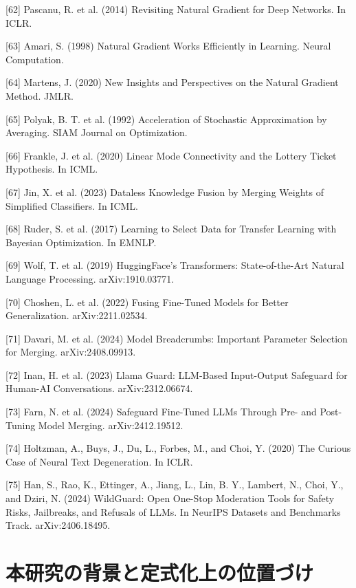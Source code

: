 \documentclass{article}
\begin{document}
{[62] Pascanu, R. et al. (2014) Revisiting Natural Gradient for Deep Networks. In ICLR.

[63] Amari, S. (1998) Natural Gradient Works Efficiently in Learning. Neural Computation.

[64] Martens, J. (2020) New Insights and Perspectives on the Natural Gradient Method. JMLR.

[65] Polyak, B. T. et al. (1992) Acceleration of Stochastic Approximation by Averaging. SIAM Journal on Optimization.

[66] Frankle, J. et al. (2020) Linear Mode Connectivity and the Lottery Ticket Hypothesis. In ICML.

[67] Jin, X. et al. (2023) Dataless Knowledge Fusion by Merging Weights of Simplified Classifiers. In ICML.

[68] Ruder, S. et al. (2017) Learning to Select Data for Transfer Learning with Bayesian Optimization. In EMNLP.

[69] Wolf, T. et al. (2019) HuggingFace's Transformers: State-of-the-Art Natural Language Processing. arXiv:1910.03771.

[70] Choshen, L. et al. (2022) Fusing Fine-Tuned Models for Better Generalization. arXiv:2211.02534.

[71] Davari, M. et al. (2024) Model Breadcrumbs: Important Parameter Selection for Merging. arXiv:2408.09913.

[72] Inan, H. et al. (2023) Llama Guard: LLM-Based Input-Output Safeguard for Human-AI Conversations. arXiv:2312.06674.

[73] Farn, N. et al. (2024) Safeguard Fine-Tuned LLMs Through Pre- and Post-Tuning Model Merging. arXiv:2412.19512.

[74] Holtzman, A., Buys, J., Du, L., Forbes, M., and Choi, Y. (2020) The Curious Case of Neural Text Degeneration. In ICLR.

[75] Han, S., Rao, K., Ettinger, A., Jiang, L., Lin, B. Y., Lambert, N., Choi, Y., and Dziri, N. (2024) WildGuard: Open One-Stop Moderation Tools for Safety Risks, Jailbreaks, and Refusals of LLMs. In NeurIPS Datasets and Benchmarks Track. arXiv:2406.18495.
}


\newpage
\appendix

\section{本研究の背景と定式化上の位置づけ}
\label{app:本研究の背景と定式化上の位置づけ}
\end{document}
